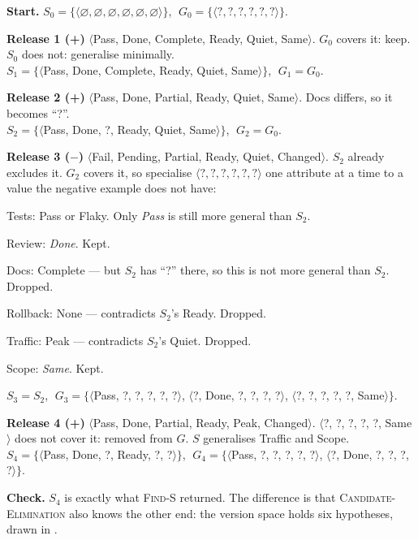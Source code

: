 \begin{worked}
\textbf{Start.} $S_0 = \{\langle\varnothing, \varnothing, \varnothing, \varnothing,
\varnothing, \varnothing\rangle\}$, $\;G_0 = \{\langle ?, ?, ?, ?, ?, ?\rangle\}$.

\smallskip
\textbf{Release 1 (+)} $\langle$Pass, Done, Complete, Ready, Quiet, Same$\rangle$.
$G_0$ covers it: keep. $S_0$ does not: generalise minimally.\\
$S_1 = \{\langle$Pass, Done, Complete, Ready, Quiet, Same$\rangle\}$, $\;G_1 = G_0$.

\smallskip
\textbf{Release 2 (+)} $\langle$Pass, Done, Partial, Ready, Quiet, Same$\rangle$.
Docs differs, so it becomes ``?''.\\
$S_2 = \{\langle$Pass, Done, ?, Ready, Quiet, Same$\rangle\}$, $\;G_2 = G_0$.

\smallskip
\textbf{Release 3 ($-$)} $\langle$Fail, Pending, Partial, Ready, Quiet, Changed$\rangle$.
$S_2$ already excludes it. $G_2$ covers it, so specialise $\langle ?, ?, ?, ?, ?,
?\rangle$ one attribute at a time to a value the negative example does not have:
\begin{tight}
  \item Tests: Pass or Flaky. Only \emph{Pass} is still more general than $S_2$.
  \item Review: \emph{Done}. Kept.
  \item Docs: Complete --- but $S_2$ has ``?'' there, so this is not more
        general than $S_2$. Dropped.
  \item Rollback: None --- contradicts $S_2$'s Ready. Dropped.
  \item Traffic: Peak --- contradicts $S_2$'s Quiet. Dropped.
  \item Scope: \emph{Same}. Kept.
\end{tight}
$S_3 = S_2$, $\;G_3 = \{\langle$Pass, ?, ?, ?, ?, ?$\rangle$, $\langle$?, Done, ?,
?, ?, ?$\rangle$, $\langle$?, ?, ?, ?, ?, Same$\rangle\}$.

\smallskip
\textbf{Release 4 (+)} $\langle$Pass, Done, Partial, Ready, Peak, Changed$\rangle$.
$\langle$?, ?, ?, ?, ?, Same$\rangle$ does not cover it: removed from $G$. $S$
generalises Traffic and Scope.\\
$S_4 = \{\langle$Pass, Done, ?, Ready, ?, ?$\rangle\}$, $\;G_4 = \{\langle$Pass, ?,
?, ?, ?, ?$\rangle$, $\langle$?, Done, ?, ?, ?, ?$\rangle\}$.

\smallskip
\textbf{Check.} $S_4$ is exactly what \textsc{Find-S} returned. The difference is
that \textsc{Candidate-Elimination} also knows the other end: the version space
holds six hypotheses, drawn in .
\end{worked}

